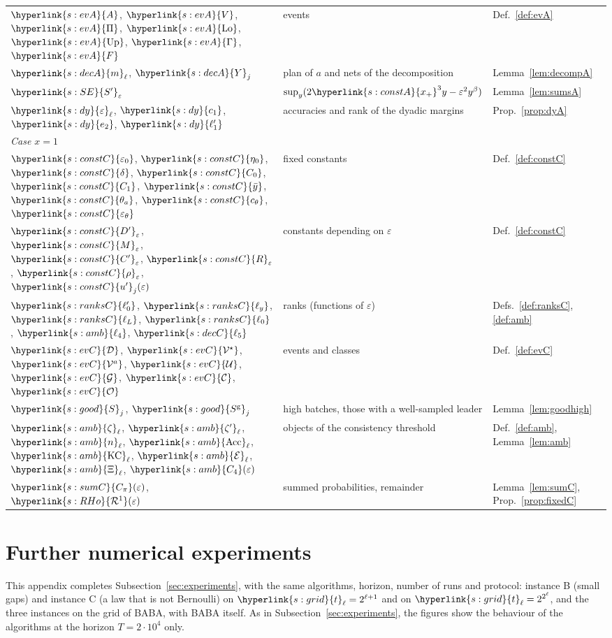 \documentclass[10pt]{article}
\newcommand{\sy}[2]{{\hyperlink{#1}{#2}}}
\newcommand{\1}{\mathbf{1}}
\newcommand{\tl}{\sy{s:grid}{t}}
\newcommand{\xp}{\sy{s:constA}{x_+}}
\newcommand{\SE}{\sy{s:SE}{S'}}
\newcommand{\Ag}{\sy{s:evA}{A}}
\newcommand{\Vg}{\sy{s:evA}{V}}
\newcommand{\Pig}{\sy{s:evA}{\Pi}}
\newcommand{\Lo}{\sy{s:evA}{\mathrm{Lo}}}
\newcommand{\Up}{\sy{s:evA}{\mathrm{Up}}}
\newcommand{\Gg}{\sy{s:evA}{\Gamma}}
\newcommand{\Fg}{\sy{s:evA}{F}}
\newcommand{\mt}{\sy{s:decA}{m}}
\newcommand{\Yg}{\sy{s:decA}{Y}}
\newcommand{\epl}{\sy{s:dy}{\varepsilon}}
\newcommand{\cone}{\sy{s:dy}{c_1}}
\newcommand{\etwo}{\sy{s:dy}{e_2}}
\newcommand{\lonep}{\sy{s:dy}{\ell'_1}}
\newcommand{\ez}{\sy{s:constC}{\varepsilon_0}}
\newcommand{\ezz}{\sy{s:constC}{\eta_0}}
\newcommand{\dl}{\sy{s:constC}{\delta}}
\newcommand{\Cz}{\sy{s:constC}{C_{0}}}
\newcommand{\Co}{\sy{s:constC}{C_1}}
\newcommand{\Dp}{\sy{s:constC}{D'}}
\newcommand{\Me}{\sy{s:constC}{M}}
\newcommand{\Cg}{\sy{s:constC}{C'}}
\newcommand{\Rz}{\sy{s:constC}{R}}
\newcommand{\rz}{\sy{s:constC}{\rho}}
\newcommand{\up}{\sy{s:constC}{u'}}
\newcommand{\yb}{\sy{s:constC}{\bar y}}
\newcommand{\thc}{\sy{s:constC}{\theta_a}}
\newcommand{\ctl}{\sy{s:constC}{c_{\theta}}}
\newcommand{\epth}{\sy{s:constC}{\varepsilon_{\theta}}}
\newcommand{\lzp}{\sy{s:ranksC}{\ell'_0}}
\newcommand{\ly}{\sy{s:ranksC}{\ell_y}}
\newcommand{\lonez}{\sy{s:ranksC}{\ell_L}}
\newcommand{\lz}{\sy{s:ranksC}{\ell_0}}
\newcommand{\Dev}{\sy{s:evC}{\mathcal D}}
\newcommand{\Vs}{\sy{s:evC}{\mathcal V^\star}}
\newcommand{\Va}{\sy{s:evC}{\mathcal V^a}}
\newcommand{\cU}{\sy{s:evC}{\mathcal U}}
\newcommand{\cG}{\sy{s:evC}{\mathcal G}}
\newcommand{\cC}{\sy{s:evC}{\mathcal C}}
\newcommand{\cO}{\sy{s:evC}{\mathcal O}}
\newcommand{\Shi}{\sy{s:good}{S}}
\newcommand{\Sgo}{\sy{s:good}{S^{\mathrm g}}}
\newcommand{\Eamb}{\sy{s:amb}{\mathcal E}}
\newcommand{\lfour}{\sy{s:amb}{\ell_4}}
\newcommand{\zet}{\sy{s:amb}{\zeta}}
\newcommand{\zetp}{\sy{s:amb}{\zeta'}}
\newcommand{\nl}{\sy{s:amb}{n}}
\newcommand{\Acc}{\sy{s:amb}{\mathrm{Acc}}}
\newcommand{\KC}{\sy{s:amb}{\mathrm{KC}}}
\newcommand{\cell}{\sy{s:amb}{\Xi}}
\newcommand{\Cfour}{\sy{s:amb}{C_4}}
\newcommand{\Cpi}{\sy{s:sumC}{C_\pi}}
\newcommand{\RHo}{\sy{s:RHo}{\mathcal R^{1}}}
\newcommand{\lfive}{\sy{s:decC}{\ell_5}}
\begin{document}
\begin{center}
\begin{tabular}{p{4.0cm}p{8.2cm}p{2.6cm}}
$\Ag$, $\Vg$, $\Pig$, $\Lo$, $\Up$, $\Gg$, $\Fg$ & events & Def.~\ref{def:evA}\\
$\mt_\ell$, $\Yg_j$ & plan of $a$ and nets of the decomposition & Lemma~\ref{lem:decompA}\\
$\SE_\varepsilon$ & $\sup_y(2\xp^3y-\varepsilon^2y^\beta)$ & Lemma~\ref{lem:sumsA}\\
$\epl_\ell$, $\cone$, $\etwo$, $\lonep$ & accuracies and rank of the dyadic margins & Prop.~\ref{prop:dyA}\\
\midrule
\multicolumn{3}{l}{\emph{Case $x=1$}}\\
$\ez$, $\ezz$, $\dl$, $\Cz$, $\Co$, $\yb$, $\thc$, $\ctl$, $\epth$ & fixed constants & Def.~\ref{def:constC}\\
$\Dp_\varepsilon$, $\Me_\varepsilon$, $\Cg_\varepsilon$, $\Rz_\varepsilon$, $\rz_\varepsilon$, $\up_j(\varepsilon)$ & constants depending on $\varepsilon$ & Def.~\ref{def:constC}\\
$\lzp$, $\ly$, $\lonez$, $\lz$, $\lfour$, $\lfive$ & ranks (functions of $\varepsilon$) & Defs.~\ref{def:ranksC}, \ref{def:amb}\\
$\Dev$, $\Vs$, $\Va$, $\cU$, $\cG$, $\cC$, $\cO$ & events and classes & Def.~\ref{def:evC}\\
$\Shi_j$, $\Sgo_j$ & high batches, those with a well-sampled leader & Lemma~\ref{lem:goodhigh}\\
$\zet_\ell$, $\zetp_\ell$, $\nl_\ell$, $\Acc_\ell$, $\KC_\ell$, $\Eamb_\ell$, $\cell_\ell$, $\Cfour(\varepsilon)$ & objects of the consistency threshold & Def.~\ref{def:amb}, Lemma~\ref{lem:amb}\\
$\Cpi(\varepsilon)$, $\RHo(\varepsilon)$ & summed probabilities, remainder & Lemma~\ref{lem:sumC}, Prop.~\ref{prop:fixedC}\\
\bottomrule
\end{tabular}
\end{center}

\section{Further numerical experiments}\label{sec:app-experiments}

This appendix completes Subsection~\ref{sec:experiments}, with the same algorithms, horizon, number of runs and protocol: instance B (small gaps) and
instance C (a law that is not Bernoulli) on $\tl_\ell=2^{\ell+1}$ and on $\tl_\ell=2^{2^\ell}$, and the three instances on the grid of BABA, with BABA itself.
As in Subsection~\ref{sec:experiments}, the figures show the behaviour of the algorithms at the horizon $T=2\cdot10^4$ only.
\end{document}
